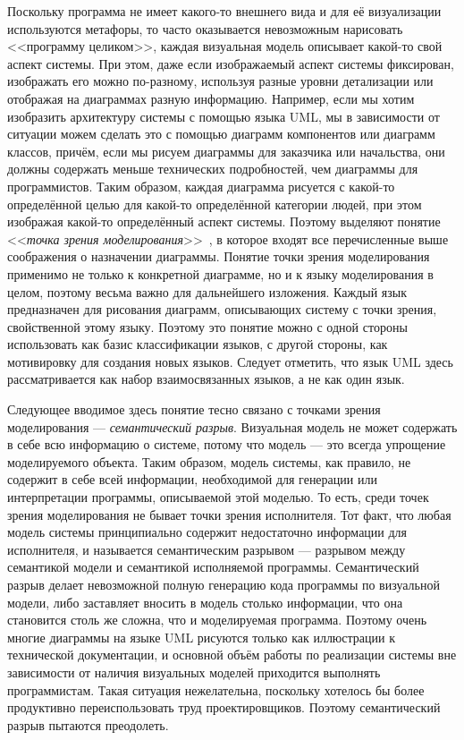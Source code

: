 Поскольку программа не имеет какого-то внешнего вида и для её визуализации 
используются метафоры, то часто оказывается невозможным нарисовать 
<<программу целиком>>, каждая визуальная модель описывает какой-то свой аспект 
системы. При этом, даже если изображаемый аспект системы фиксирован, изображать 
его можно по-разному, используя разные уровни детализации или отображая на 
диаграммах разную информацию. Например, если мы хотим изобразить архитектуру 
системы с помощью языка \ac{UML}, мы в зависимости от ситуации можем сделать это с 
помощью диаграмм компонентов или диаграмм классов, причём, если мы рисуем 
диаграммы для заказчика или начальства, они должны содержать меньше технических 
подробностей, чем диаграммы для программистов. Таким образом, каждая диаграмма 
рисуется с какой-то определённой целью для какой-то определённой категории 
людей, при этом изображая какой-то определённый аспект системы. Поэтому выделяют 
понятие <<\textit{точка зрения моделирования}>>~\cite{koznov2008osnovy}, в которое входят все перечисленные выше 
соображения о назначении диаграммы. Понятие точки зрения моделирования применимо 
не только к конкретной диаграмме, но и к языку моделирования в целом, поэтому 
весьма важно для дальнейшего изложения. Каждый язык предназначен для рисования 
диаграмм, описывающих систему с точки зрения, свойственной этому языку. 
Поэтому это понятие можно с одной стороны использовать как базис классификации 
языков, с другой стороны, как мотивировку для создания новых языков. Следует отметить, 
что язык \ac{UML} здесь рассматривается как набор взаимосвязанных 
языков, а не как один язык.

Следующее вводимое здесь понятие тесно связано с точками зрения моделирования 
--- \textit{семантический разрыв}. Визуальная модель не может содержать в себе всю 
информацию о системе, потому что модель --- это всегда упрощение моделируемого 
объекта. Таким образом, модель системы, как правило, не содержит в себе всей 
информации, необходимой для генерации или интерпретации программы, описываемой 
этой моделью. То есть, среди точек зрения моделирования не бывает точки зрения 
исполнителя. Тот факт, что любая модель системы принципиально содержит 
недостаточно информации для исполнителя, и называется семантическим разрывом ---
разрывом между семантикой модели и семантикой исполняемой программы. 
Семантический разрыв делает невозможной полную генерацию кода программы по 
визуальной модели, либо заставляет вносить в модель столько информации, что 
она становится столь же сложна, что и моделируемая программа. Поэтому очень 
многие диаграммы на языке \ac{UML} рисуются только как иллюстрации к технической 
документации, и основной объём работы по реализации системы вне зависимости от 
наличия визуальных моделей приходится выполнять программистам. Такая ситуация 
нежелательна, поскольку хотелось бы более продуктивно переиспользовать труд 
проектировщиков. Поэтому семантический разрыв пытаются преодолеть.

